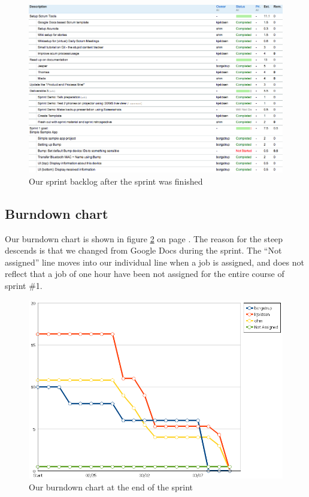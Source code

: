 \documentclass[a4paper,11pt]{article}
\begin{document}
\begin{figure}[ht!]
	\begin{center}
	\includegraphics[width=1.4\textwidth, angle=-90]{sprintbacklog.png}		
	\end{center}
	\caption{Our sprint backlog after the sprint was finished}
	\label{sprintbacklog}
\end{figure}

\subsection{Burndown chart}

Our burndown chart is shown in figure \ref{burndown} on page \pageref{burndown}.
The reason for the steep descends is that we changed from Google Docs during the sprint.
The ``Not assigned'' line moves into our individual line when a job is assigned, and does not reflect that a job of one hour have been not assigned for the entire course of sprint \#1.

\begin{figure}[ht!]
	\begin{center}
	\includegraphics[width=\textwidth]{burndown.png}		
	\end{center}
	\caption{Our burndown chart at the end of the sprint}
	\label{burndown}
\end{figure}
\end{document}
